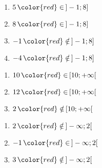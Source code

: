 \documentclass[a4paper,dvipsnames]{article}
\begin{document}
\begin{multicols}{4}
  \begin{enumerate}
    \item [] $5{\,\color{red}\in\,}]-1;8]$\columnbreak
    \item [] $8{\,\color{red}\in\,}]-1;8]$\columnbreak
    \item [] $-1{\,\color{red}\notin\,}]-1;8]$\columnbreak
    \item [] $-4{\,\color{red}\notin\,}]-1;8]$
  \end{enumerate}
\end{multicols}

\begin{multicols}{4}
  \begin{enumerate}
    \item [] $10{\,\color{red}\in\,}[10;+\infty[$\columnbreak
    \item [] $12{\,\color{red}\in\,}[10;+\infty[$\columnbreak
    \item [] $2{\,\color{red}\notin\,}[10;+\infty[$
  \end{enumerate}
\end{multicols}

\begin{multicols}{4}
  \begin{enumerate}
    \item [] $2{\,\color{red}\notin\,}]-\infty;2[$\columnbreak
    \item [] $-1{\,\color{red}\in\,}]-\infty;2[$\columnbreak
    \item [] $3{\,\color{red}\notin\,}]-\infty;2[$
  \end{enumerate}
\end{multicols}

\bigskip
\end{document}
